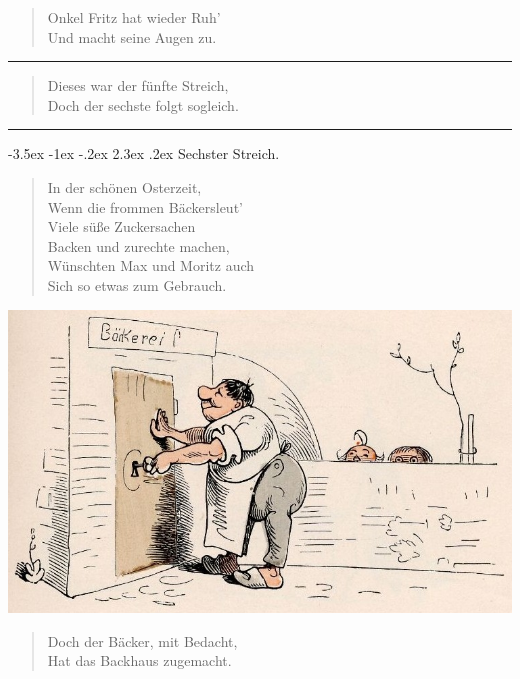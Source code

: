 \documentclass[a4paper,12pt]{article}
\makeatletter
\renewcommand\section{\@startsection {section}{1}{\z@}%
                                   {-3.5ex \@plus -1ex \@minus -.2ex}%
                                   {2.3ex \@plus.2ex}%
                                   {\centering\normalfont\LARGE\bfseries}}
\makeatother
\begin{document}
\begin{verse}
Onkel Fritz hat wieder Ruh'\\{}
Und macht seine Augen zu.
\end{verse}


\hrule


\begin{verse}
Dieses war der fünfte Streich,\\{}
Doch der sechste folgt sogleich.
\end{verse}


\hrule


\clearpage
\section{Sechster Streich.\label{Sechster_Streich}}


\begin{verse}
In der schönen Osterzeit,\\{}
Wenn die frommen Bäckersleut'\\{}
Viele süße Zuckersachen\\{}
Backen und zurechte machen,\\{}
Wünschten Max und Moritz auch\\{}
Sich so etwas zum Gebrauch.
\end{verse}



\begin{center}\includegraphics[scale=.7, alt={Der Bäcker macht das Backhaus zu}]{images/6-01.jpg}\end{center}



\begin{verse}
Doch der Bäcker, mit Bedacht,\\{}
Hat das Backhaus zugemacht.
\end{verse}
\end{document}
